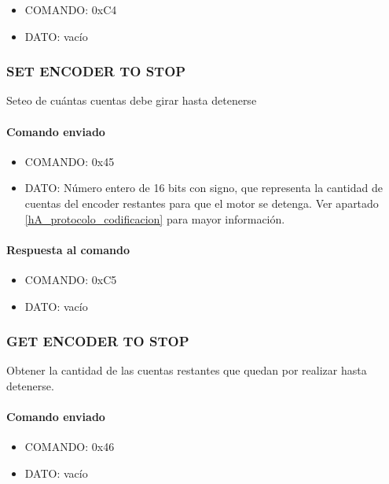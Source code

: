 \begin{itemize}
	\item{COMANDO:} 0xC4
	\item{DATO:} vac\'io
\end{itemize}

\subsubsection{SET ENCODER TO STOP}
\label{hA_protocolo_set_encoder_to_stop}

Seteo de cu\'antas cuentas debe girar hasta detenerse

\paragraph*{Comando enviado}

\begin{itemize}
	\item{COMANDO:} 0x45
	\item{DATO:} N\'umero entero de 16 bits con signo, que representa la cantidad de cuentas del encoder restantes para que el motor se detenga.
		Ver apartado \ref{hA_protocolo_codificacion} para mayor informaci\'on.
\end{itemize}

\paragraph*{Respuesta al comando}

\begin{itemize}
	\item{COMANDO:} 0xC5
	\item{DATO:} vac\'io
\end{itemize}

\subsubsection{GET ENCODER TO STOP}
\label{hA_protocolo_get_encoder_to_stop}

Obtener la cantidad de las cuentas restantes que quedan por realizar hasta detenerse.

\paragraph*{Comando enviado}

\begin{itemize}
	\item{COMANDO:} 0x46
	\item{DATO:} vac\'io
\end{itemize}

